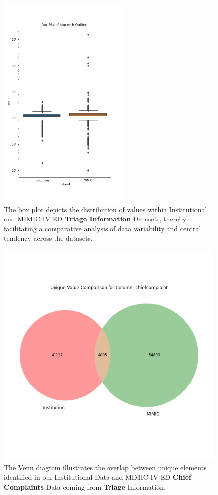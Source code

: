 \documentclass{article}
\theoremstyle{plain}
\theoremstyle{definition}
\theoremstyle{remark}
\begin{document}
\begin{figure}[h!]
   \includegraphics[width=2.5in]{plots/sbp_triage_boxplot.png} 
   \caption{The box plot depicts the distribution of values within Institutional and MIMIC-IV ED \textbf{Triage Information} Datasets, thereby facilitating a comparative analysis of data variability and central tendency across the datasets.}
   \label{app4} 
 \end{figure} 

 \begin{figure}[h!]
   \centering 
   \includegraphics[width=5in]{plots/chiefcomplaint_venn.png} 
   \caption{The Venn diagram illustrates the overlap between unique elements identified in our Institutional Data and MIMIC-IV ED \textbf{Chief Complaints} Data coming from \textbf{Triage} Information.}
   \label{app5} 
 \end{figure} 
\end{document}
